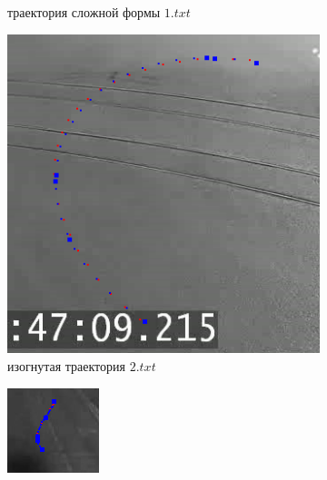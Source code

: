 \begin{figure}[!htb]
\begin{subfigure}[!htb]{0.3\textwidth}
		\caption{траектория сложной формы $1.txt$}
	\end{subfigure}
	\hfill
	\begin{subfigure}[!htb]{0.3\textwidth}
		\centering{}
		\includegraphics[width=\textwidth]{images/regr_kp_curve_2.png}
		\caption{изогнутая траектория $2.txt$}
	\end{subfigure}
	\hfill
	\begin{subfigure}[!htb]{0.3\textwidth}
		\centering{}
		\includegraphics[width=\textwidth]{images/regr_kp_complex_3.png}

\end{subfigure}
\end{figure}
